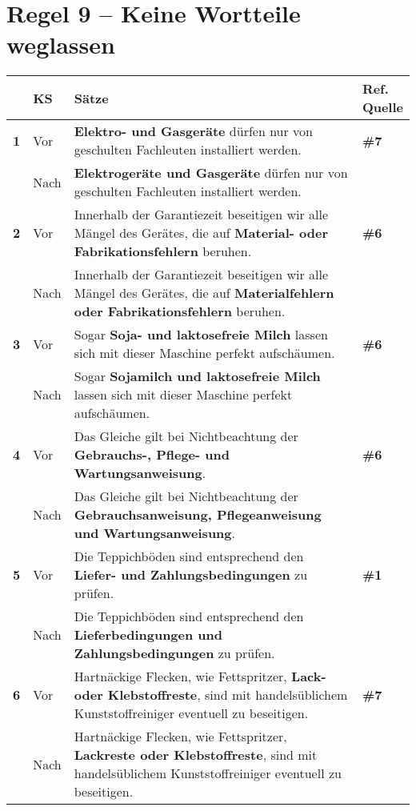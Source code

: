 \section*{Regel 9 -- Keine Wortteile weglassen}


\begin{longtable}{llp{}l}

\lsptoprule
{} & \textbf{KS} & \textbf{Sätze} & \makecell[tl]{\textbf{Ref.}\\\textbf{Quelle}}\\
\midrule
{ \textbf{1}} & Vor & \textbf{Elektro- und Gasgeräte} dürfen nur von geschulten Fachleuten installiert werden. & \textbf{\#7}\\
& Nach & \textbf{Elektrogeräte und Gasgeräte} dürfen nur von geschulten Fachleuten installiert werden. & \\
\tablevspace
{ \textbf{2}} & Vor & Innerhalb der Garantiezeit beseitigen wir alle Mängel des Gerätes, die auf \textbf{Material- oder Fabrikationsfehlern} beruhen. & \textbf{\#6}\\
& Nach & Innerhalb der Garantiezeit beseitigen wir alle Mängel des Gerätes, die auf \textbf{Materialfehlern oder Fabrikationsfehlern} beruhen. & \\
\tablevspace
{ \textbf{3}} & Vor & Sogar \textbf{Soja- und laktosefreie Milch} lassen sich mit dieser Maschine perfekt aufschäumen. & \textbf{\#6}\\
& Nach & Sogar \textbf{Sojamilch und laktosefreie Milch} lassen sich mit dieser Maschine perfekt aufschäumen. & \\
\tablevspace
{ \textbf{4}} & Vor & Das Gleiche gilt bei Nichtbeachtung der \textbf{Gebrauchs-, Pflege- und Wartungsanweisung}. & \textbf{\#6}\\
& Nach & Das Gleiche gilt bei Nichtbeachtung der \textbf{Gebrauchsanweisung, Pflegeanweisung und Wartungsanweisung}. & \\
\tablevspace
{ \textbf{5}} & Vor & Die Teppichböden sind entsprechend den \textbf{Liefer- und Zahlungsbedingungen} zu prüfen. & \textbf{\#1}\\
& Nach & Die Teppichböden sind entsprechend den \textbf{Lieferbedingungen und Zahlungsbedingungen} zu prüfen. & \\
\tablevspace
{ \textbf{6}} & Vor & Hartnäckige Flecken, wie Fettspritzer, \textbf{Lack- oder Klebstoffreste}, sind mit handelsüblichem Kunststoffreiniger eventuell zu beseitigen. & \textbf{\#7}\\
& Nach & Hartnäckige Flecken, wie Fettspritzer, \textbf{Lackreste oder Klebstoffreste}, sind mit handelsüblichem Kunststoffreiniger eventuell zu beseitigen. & \\

\end{longtable}
